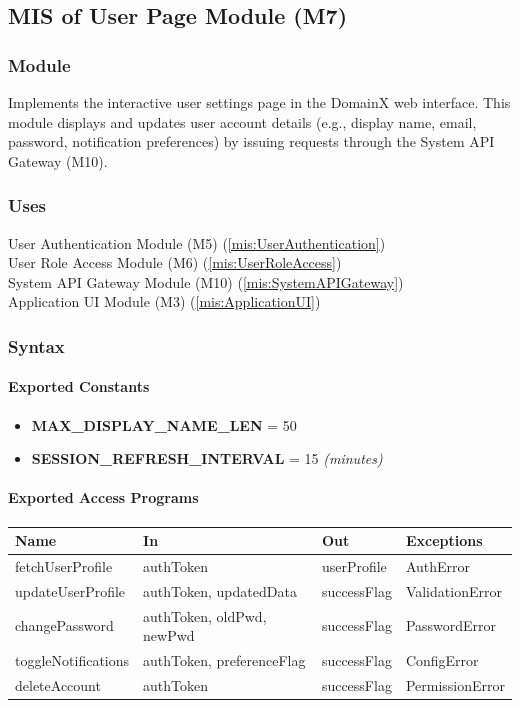 \documentclass[12pt, titlepage]{article}
\begin{document}
\subsection{MIS of User Page Module (M7)}
\label{mis:UserPage}

\subsubsection{Module}
Implements the interactive user settings page in the DomainX web interface.
This module displays and updates user account details (e.g., display name, email, password, notification preferences) by issuing requests through the System API Gateway (M10).


\subsubsection{Uses}
User Authentication Module (M5) (\ref{mis:UserAuthentication})\\
User Role Access Module (M6) (\ref{mis:UserRoleAccess})\\
System API Gateway Module (M10) (\ref{mis:SystemAPIGateway})\\
Application UI Module (M3) (\ref{mis:ApplicationUI})

\subsubsection{Syntax}

\paragraph{Exported Constants}
\begin{itemize}
  \item \textbf{MAX\_DISPLAY\_NAME\_LEN} = 50
  \item \textbf{SESSION\_REFRESH\_INTERVAL} = 15 \textit{(minutes)}
\end{itemize}

\paragraph{Exported Access Programs}
\begin{center}
\renewcommand{\arraystretch}{1.2}
\begin{tabularx}{\textwidth}{l X X l}
\toprule
\textbf{Name} & \textbf{In} & \textbf{Out} & \textbf{Exceptions}\\
\midrule
fetchUserProfile & authToken & userProfile & AuthError \\
updateUserProfile & authToken, updatedData & successFlag & ValidationError \\
changePassword & authToken, oldPwd, newPwd & successFlag & PasswordError \\
toggleNotifications & authToken, preferenceFlag & successFlag & ConfigError \\
deleteAccount & authToken & successFlag & PermissionError \\
\bottomrule
\end{tabularx}
\end{center}
\end{document}

